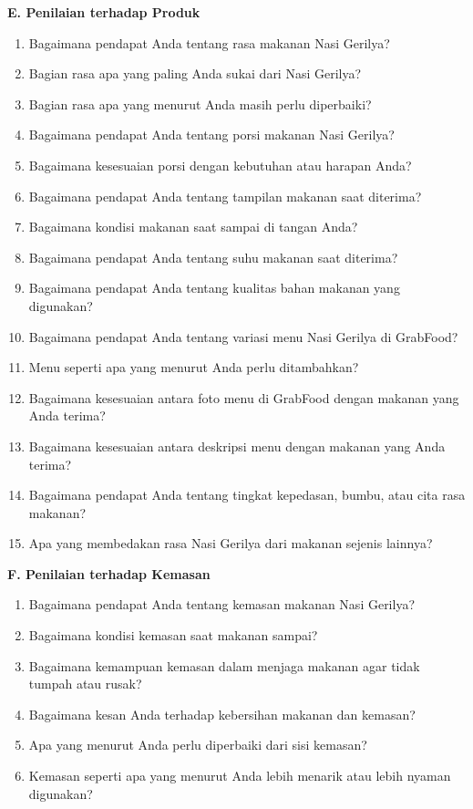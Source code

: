 \documentclass[10pt,a4paper]{article}
\newcommand{\sectionbar}[1]{%
  \Needspace{5\baselineskip}
  \vspace{4mm}
  \noindent\colorbox{Soft}{%
    \parbox{\dimexpr\linewidth-2\fboxsep\relax}{%
      \large\bfseries\textcolor{Primary}{#1}
    }%
  }\par\vspace{1mm}
}
\newcommand{\probe}[1]{%
  \vspace{1mm}
  \noindent{\small\textbf{\textcolor{Accent}{Probing:}} \textcolor{TextGray}{#1}}\par
}
\begin{document}
\sectionbar{E. Penilaian terhadap Produk}
\begin{enumerate}[label=\arabic*.,leftmargin=*,itemsep=1.2mm,resume]
\item Bagaimana pendapat Anda tentang rasa makanan Nasi Gerilya?
\item Bagian rasa apa yang paling Anda sukai dari Nasi Gerilya?
\item Bagian rasa apa yang menurut Anda masih perlu diperbaiki?
\item Bagaimana pendapat Anda tentang porsi makanan Nasi Gerilya?
\item Bagaimana kesesuaian porsi dengan kebutuhan atau harapan Anda?
\item Bagaimana pendapat Anda tentang tampilan makanan saat diterima?
\item Bagaimana kondisi makanan saat sampai di tangan Anda?
\item Bagaimana pendapat Anda tentang suhu makanan saat diterima?
\item Bagaimana pendapat Anda tentang kualitas bahan makanan yang digunakan?
\item Bagaimana pendapat Anda tentang variasi menu Nasi Gerilya di GrabFood?
\item Menu seperti apa yang menurut Anda perlu ditambahkan?
\item Bagaimana kesesuaian antara foto menu di GrabFood dengan makanan yang Anda terima?
\item Bagaimana kesesuaian antara deskripsi menu dengan makanan yang Anda terima?
\item Bagaimana pendapat Anda tentang tingkat kepedasan, bumbu, atau cita rasa makanan?
\item Apa yang membedakan rasa Nasi Gerilya dari makanan sejenis lainnya?
\end{enumerate}
\probe{Gali pengalaman makan terakhir: rasa, porsi, suhu, tampilan, dan kesesuaian dengan ekspektasi.}

\sectionbar{F. Penilaian terhadap Kemasan}
\begin{enumerate}[label=\arabic*.,leftmargin=*,itemsep=1.2mm,resume]
\item Bagaimana pendapat Anda tentang kemasan makanan Nasi Gerilya?
\item Bagaimana kondisi kemasan saat makanan sampai?
\item Bagaimana kemampuan kemasan dalam menjaga makanan agar tidak tumpah atau rusak?
\item Bagaimana kesan Anda terhadap kebersihan makanan dan kemasan?
\item Apa yang menurut Anda perlu diperbaiki dari sisi kemasan?
\item Kemasan seperti apa yang menurut Anda lebih menarik atau lebih nyaman digunakan?
\end{enumerate}
\probe{Tanyakan apakah pernah ada makanan bocor, rusak, berantakan, atau sulit dimakan dari kemasan.}
\end{document}
